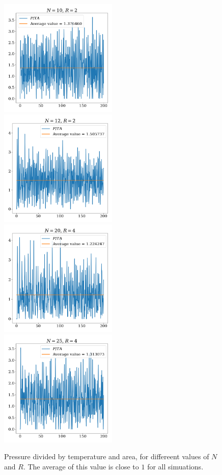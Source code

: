 \documentclass{article}
\begin{document}
        \begin{figure}
        
            \includegraphics[width = 0.5\textwidth]{pressure_10_particles_R_2}
            \includegraphics[width = 0.5\textwidth]{pressure_12_particles_R_2}
            \includegraphics[width = 0.5\textwidth]{pressure_20_particles_R_4}
            \includegraphics[width = 0.5\textwidth]{pressure_25_particles_R_4}
            \caption{Pressure divided by temperature and area, for differeent values of $N$ and $R$. The average of this value is close to $1$ for all simuations.}
            \label{ideal gas}

        \end{figure}
\end{document}
